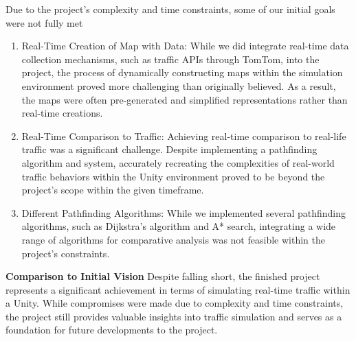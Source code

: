 Due to the project's complexity and time constraints, some of our initial goals were not fully met
\begin{enumerate}
	\item Real-Time Creation of Map with Data: While we did integrate real-time data collection mechanisms, such as traffic APIs through TomTom, into the project, the process of dynamically constructing maps within the simulation environment proved more challenging than originally believed. As a result, the maps were often pre-generated and simplified representations rather than real-time creations.
	\item Real-Time Comparison to Traffic: Achieving real-time comparison to real-life traffic was a significant challenge. Despite implementing a pathfinding algorithm and system, accurately recreating the complexities of real-world traffic behaviors within the Unity environment proved to be beyond the project's scope within the given timeframe.
	\item Different Pathfinding Algorithms: While we implemented several pathfinding algorithms, such as Dijkstra's algorithm and A* search, integrating a wide range of algorithms for comparative analysis was not feasible within the project's constraints.
\end{enumerate}
\textbf{Comparison to Initial Vision}
Despite falling short, the finished project represents a significant achievement in terms of simulating real-time traffic within a Unity. While compromises were made due to complexity and time constraints, the project still provides valuable insights into traffic simulation and serves as a foundation for future developments to the project.
